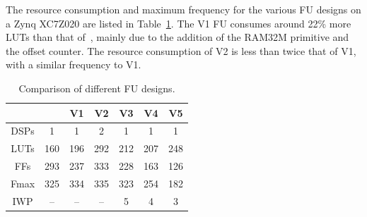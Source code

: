 The resource consumption and maximum frequency for the various FU designs on a Zynq XC7Z020 are listed in Table~\ref{FU_table}.
The V1 FU consumes around 22\% more LUTs than that of~\cite{li2016area}, mainly due to the addition of the RAM32M primitive and the offset counter. 
The resource consumption of V2 is less than twice that of V1, with a similar frequency to V1.



\begin{table}[tb]
	\caption{Comparison of different FU designs.}
	\label{FU_table}
	\centering
	\small
	\begin{tabular}{ccccccc}
		\toprule
		     & ~\cite{li2016area} & V1  & V2  & V3  & V4  & V5  \\ \midrule
		DSPs &         1          &  1  &  2  &  1  &  1  &  1  \\
		LUTs &        160         & 196 & 292 & 212 & 207 & 248 \\
		FFs  &        293         & 237 & 333 & 228 & 163 & 126 \\
		Fmax &        325         & 334 & 335 & 323 & 254 & 182 \\
		IWP  &         --         & --  & --  &  5  &  4  &  3  \\ \bottomrule
	\end{tabular}
\end{table}



